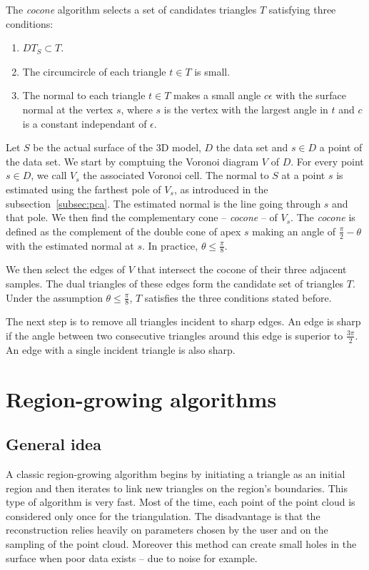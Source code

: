 \documentclass[a4paper]{article}
\begin{document}
The \emph{cocone} algorithm selects a set of candidates triangles $T$ satisfying three conditions:
\begin{enumerate}
\item $DT_S \subset T$.
\item The circumcircle of each triangle $t \in T$ is small.
\item The normal to each triangle $t \in T$ makes a small angle $c\epsilon$ with the surface normal at the vertex $s$, where $s$ is the vertex with the largest angle in $t$ and $c$ is a constant independant of $\epsilon$.
\end{enumerate}

Let $S$ be the actual surface of the 3D model, $D$ the data set and $s \in D$ a point of the data set. We start by comptuing the Voronoi diagram $V$ of $D$. For every point $s \in D$, we call $V_s$ the associated Voronoi cell. The normal to $S$ at a point $s$ is estimated using the farthest pole of $V_s$, as introduced in the subsection~\ref{subsec:pca}. The estimated normal is the line going through $s$ and that pole. We then find the complementary cone -- \emph{cocone} -- of $V_s$. The \emph{cocone} is defined as the complement of the double cone of apex $s$ making an angle of $\frac{\pi}{2}-\theta$ with the estimated normal at $s$. In practice, $\theta\le\frac{\pi}{8}$.

We then select the edges of $V$ that intersect the cocone of their three adjacent samples. The dual triangles of these edges form the candidate set of triangles $T$. Under the assumption $\theta\le\frac{\pi}{8}$, $T$ satisfies the three conditions stated before.

The next step is to remove all triangles incident to sharp edges. An edge is sharp if the angle between two consecutive triangles around this edge is superior to $\frac{3\pi}{2}$. An edge with a single incident triangle is also sharp.


\newpage

\section{Region-growing algorithms}
\subsection{General idea}
A classic region-growing algorithm begins by initiating a triangle as an initial region and then iterates to link new triangles on the region's boundaries. This type of algorithm is very fast. Most of the time, each point of the point cloud is considered only once for the triangulation. The disadvantage is that the reconstruction relies heavily on parameters chosen by the user and on the sampling of the point cloud. Moreover this method can create small holes in the surface when poor data  exists -- due to noise for example. 
\end{document}
